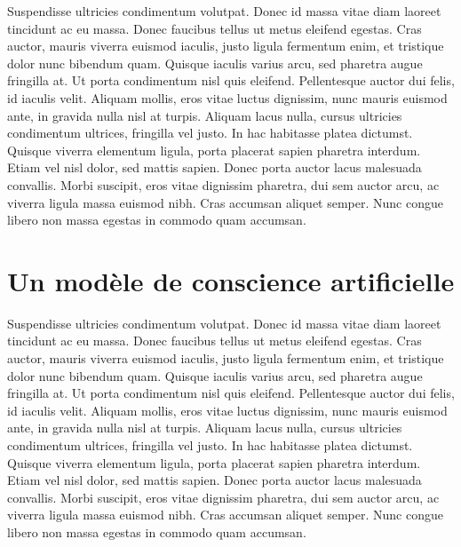 Suspendisse ultricies condimentum volutpat. Donec id massa vitae diam laoreet tincidunt ac eu massa. Donec faucibus tellus ut metus eleifend egestas. Cras auctor, mauris viverra euismod iaculis, justo ligula fermentum enim, et tristique dolor nunc bibendum quam. Quisque iaculis varius arcu, sed pharetra augue fringilla at. Ut porta condimentum nisl quis eleifend. Pellentesque auctor dui felis, id iaculis velit. Aliquam mollis, eros vitae luctus dignissim, nunc mauris euismod ante, in gravida nulla nisl at turpis. Aliquam lacus nulla, cursus ultricies condimentum ultrices, fringilla vel justo. In hac habitasse platea dictumst. Quisque viverra elementum ligula, porta placerat sapien pharetra interdum. Etiam vel nisl dolor, sed mattis sapien. Donec porta auctor lacus malesuada convallis. Morbi suscipit, eros vitae dignissim pharetra, dui sem auctor arcu, ac viverra ligula massa euismod nibh. Cras accumsan aliquet semper. Nunc congue libero non massa egestas in commodo quam accumsan. 

\section{Un modèle de conscience artificielle}

Suspendisse ultricies condimentum volutpat. Donec id massa vitae diam laoreet tincidunt ac eu massa. Donec faucibus tellus ut metus eleifend egestas. Cras auctor, mauris viverra euismod iaculis, justo ligula fermentum enim, et tristique dolor nunc bibendum quam. Quisque iaculis varius arcu, sed pharetra augue fringilla at. Ut porta condimentum nisl quis eleifend. Pellentesque auctor dui felis, id iaculis velit. Aliquam mollis, eros vitae luctus dignissim, nunc mauris euismod ante, in gravida nulla nisl at turpis. Aliquam lacus nulla, cursus ultricies condimentum ultrices, fringilla vel justo. In hac habitasse platea dictumst. Quisque viverra elementum ligula, porta placerat sapien pharetra interdum. Etiam vel nisl dolor, sed mattis sapien. Donec porta auctor lacus malesuada convallis. Morbi suscipit, eros vitae dignissim pharetra, dui sem auctor arcu, ac viverra ligula massa euismod nibh. Cras accumsan aliquet semper. Nunc congue libero non massa egestas in commodo quam accumsan. 